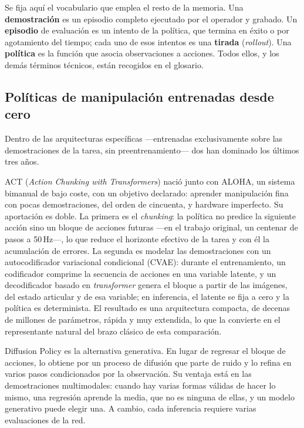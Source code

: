 Se fija aquí el vocabulario que emplea el resto de la memoria. Una \textbf{demostración} es un
episodio completo ejecutado por el operador y grabado. Un \textbf{episodio} de evaluación es un
intento de la política, que termina en éxito o por agotamiento del tiempo; cada uno de esos intentos
es una \textbf{tirada} (\textit{rollout}). Una \textbf{política} es la función que asocia
observaciones a acciones. Todos ellos, y los demás términos técnicos, están recogidos en el
glosario.

\subsection{Políticas de manipulación entrenadas desde cero}

Dentro de las arquitecturas específicas —entrenadas exclusivamente sobre las demostraciones de la
tarea, sin preentrenamiento— dos han dominado los últimos tres años.

ACT (\textit{Action Chunking with Transformers}) \cite{zhao2023aloha} nació junto con ALOHA, un
sistema bimanual de bajo coste, con un objetivo declarado: aprender manipulación fina con pocas
demostraciones, del orden de cincuenta, y hardware imperfecto. Su aportación es doble. La primera es
el \textit{chunking}: la política no predice la siguiente acción sino un bloque de acciones futuras
—en el trabajo original, un centenar de pasos a 50\,Hz—, lo que reduce el horizonte efectivo de la
tarea y con él la acumulación de errores. La segunda es modelar las demostraciones con un
autocodificador variacional condicional (CVAE): durante el entrenamiento, un codificador comprime la
secuencia de acciones en una variable latente, y un decodificador basado en \textit{transformer}
genera el bloque a partir de las imágenes, del estado articular y de esa variable; en inferencia, el
latente se fija a cero y la política es determinista. El resultado es una arquitectura compacta, de
decenas de millones de parámetros, rápida y muy extendida, lo que la convierte en el representante
natural del brazo clásico de esta comparación.

Diffusion Policy \cite{chi2023diffusion} es la alternativa generativa. En lugar de regresar el bloque
de acciones, lo obtiene por un proceso de difusión que parte de ruido y lo refina en varios pasos
condicionados por la observación. Su ventaja está en las demostraciones multimodales: cuando hay
varias formas válidas de hacer lo mismo, una regresión aprende la media, que no es ninguna de ellas,
y un modelo generativo puede elegir una. A cambio, cada inferencia requiere varias evaluaciones de
la red.

